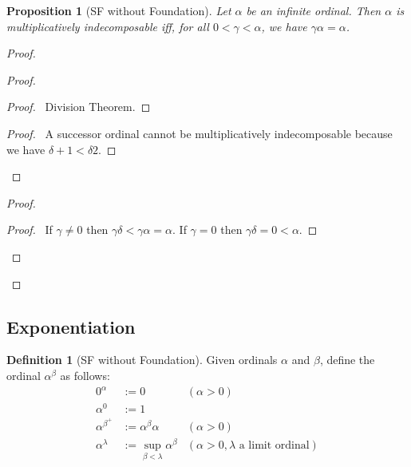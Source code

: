 \documentclass{book}
\let\qed\relax
\newtheorem{prop}[ax]{Proposition}
\theoremstyle{definition}
\newtheorem{df}[ax]{Definition}
\begin{document}
\begin{prop}[SF without Foundation]
Let $\alpha$ be an infinite ordinal. Then $\alpha$ is multiplicatively indecomposable iff, for all $0 < \gamma < \alpha$, we have $\gamma \alpha = \alpha$.
\end{prop}

\begin{proof}
\pf
{}
\begin{proof}
	\begin{proof}
		\pf\ Division Theorem.
	\end{proof}
	\begin{proof}
		\pf\ A successor ordinal cannot be multiplicatively indecomposable because we have $\delta + 1 < \delta 2$.
	\end{proof}
\end{proof}
\begin{proof}
	\begin{proof}
		\pf\ If $\gamma \neq 0$ then $\gamma \delta < \gamma \alpha = \alpha$. If $\gamma = 0$ then $\gamma \delta = 0 < \alpha$.
	\end{proof}
\end{proof}
\qed
\end{proof}

\subsection{Exponentiation}

\begin{df}[SF without Foundation]
Given ordinals $\alpha$ and $\beta$, define the ordinal $\alpha^\beta$ as follows:
\begin{align*}
0^\alpha & := 0 & (\alpha > 0) \\
\alpha^0 & := 1 \\
\alpha^{\beta^+} & := \alpha^\beta \alpha & (\alpha > 0) \\
\alpha^\lambda & := \sup_{\beta < \lambda} \alpha^\beta & (\alpha > 0, \lambda \text{ a limit ordinal})
\end{align*}
\end{df}
\end{document}
